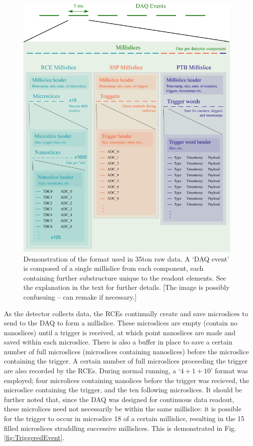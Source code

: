 \begin{figure}[p]
  \centering
  \includegraphics[width=14cm]{data_format.png}
  \caption[35ton data format]{Demonstration of the format used in 35ton raw data.  A `DAQ event' is composed of a single millislice from each component, each containing further substructure unique to the readout elements.  See the explanation in the text for further details. [The image is possibly confusuing -- can remake if necessary.]}
  \label{fig:DataFormat}
\end{figure}

As the detector collects data, the RCEs continually create and save microslices to send to the DAQ to form a millislice.  These microslices are empty (contain no nanoslices) until a trigger is received, at which point nanoslices are made and saved within each microslice.  There is also a buffer in place to save a certain number of full microslices (microslices containing nanoslices) before the microslice containing the trigger.  A certain number of full microslices proceeding the trigger are also recorded by the RCEs.  During normal running, a `$4+1+10$' format was employed; four microlices containing nanolices before the trigger was recieved, the microslice containing the trigger, and the ten following microslices.  It should be further noted that, since the DAQ was designed for continuous data readout, these microlices need not necessarily be within the same millislice: it is possible for the trigger to occur in microslice 18 of a certain millislice, resulting in the 15 filled microslices straddling successive millislices.  This is demonstrated in Fig. \ref{fig:TriggeredEvent}.

